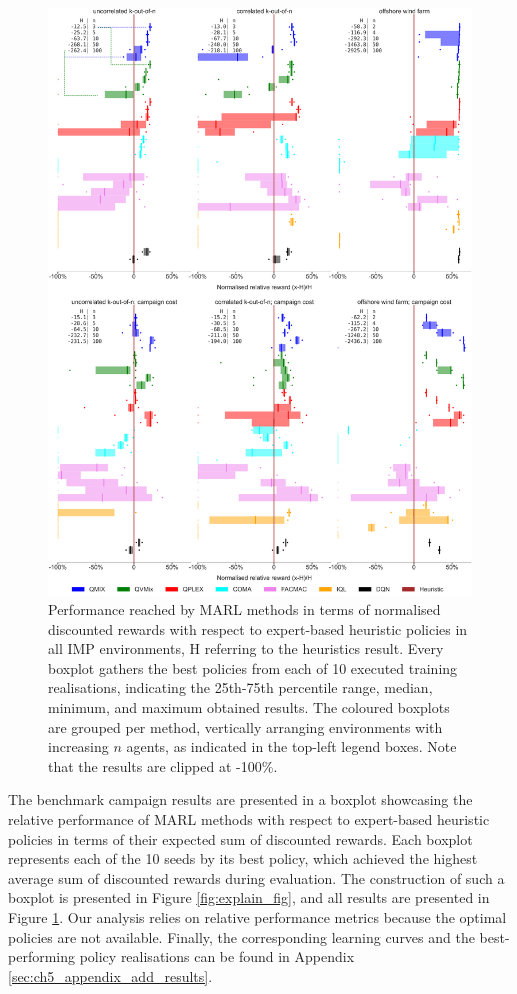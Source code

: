 \begin{figure}
    \centering
    \includegraphics[width=.86\textwidth]{tex_thesis/figures/ch5/boxplot_perc_limit.pdf}
\caption{Performance reached by MARL methods in terms of normalised discounted rewards with respect to expert-based heuristic policies in all IMP environments, H referring to the heuristics result.
Every boxplot gathers the best policies from each of 10 executed training realisations, indicating the 25th-75th percentile range, median, minimum, and maximum obtained results.
The coloured boxplots are grouped per method, vertically arranging environments with increasing $n$ agents, as indicated in the top-left legend boxes.
Note that the results are clipped at -100\%.
}
\label{fig:results}
\end{figure}

The benchmark campaign results are presented in a boxplot showcasing the relative performance of MARL methods with respect to expert-based heuristic policies in terms of their expected sum of discounted rewards.
Each boxplot represents each of the 10 seeds by its best policy, which achieved the highest average sum of discounted rewards during evaluation.
The construction of such a boxplot is presented in Figure \ref{fig:explain_fig}, and all results are presented in Figure \ref{fig:results}.
Our analysis relies on relative performance metrics because the optimal policies are not available.
Finally, the corresponding learning curves and the best-performing policy realisations can be found in Appendix \ref{sec:ch5_appendix_add_results}.

